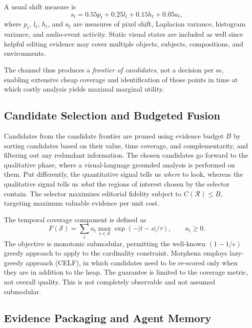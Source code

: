 \documentclass[conference]{IEEEtran}
\begin{document}
A usual shift measure is
\begin{equation}
s_t=0.55p_t+0.25l_t+0.15h_t+0.05a_t,
\end{equation}
where $p_t$, $l_t$, $h_t$, and $a_t$ are measures of pixel shift, Laplacian variance, histogram variance, and audio-event activity. Static visual states are included as well since helpful editing evidence may cover multiple objects, subjects, compositions, and environments.

The channel thus produces a \textit{frontier of candidates}, not a decision per se, enabling extensive cheap coverage and identification of those points in time at which costly analysis yields maximal marginal utility.

\subsection{Candidate Selection and Budgeted Fusion}
\label{sec:submodularity}

Candidates from the candidate frontier are pruned using evidence budget $B$ by sorting candidates based on their value, time coverage, and complementarity, and filtering out any redundant information. The chosen candidates go forward to the qualitative phase, where a visual-language grounded analysis is performed on them. Put differently, the quantitative signal tells us \textit{where} to look, whereas the qualitative signal tells us \textit{what} the regions of interest chosen by the selector contain. The selector maximizes editorial fidelity subject to $C(\mathcal{R})\leq B$, targeting maximum valuable evidence per unit cost.

The temporal coverage component is defined as
\begin{equation}
F(\mathcal{S})=\sum_t a_t\max_{s\in\mathcal{S}}
\exp(-|t-s|/\tau),\qquad a_t\geq0.
\end{equation}
The objective is monotonic submodular, permitting the well-known $(1 - 1/e)$ greedy approach to apply to the cardinality constraint. Morphena employs lazy-greedy approach (CELF), in which candidates need to be re-scored only when they are in addition to the heap. The guarantee is limited to the coverage metric, not overall quality. This is not completely observable and not assumed submodular.


\subsection{Evidence Packaging and Agent Memory}
\end{document}
